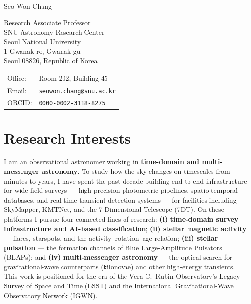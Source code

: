 \documentclass[letterpaper,11pt]{article}
\def\name{Seo-Won Chang}
\begin{document}
{\huge \name}

\vspace{0.2in}

\begin{minipage}{0.52\linewidth}
  Research Associate Professor \\
  SNU Astronomy Research Center \\
  Seoul National University \\
  1 Gwanak-ro, Gwanak-gu \\
  Seoul 08826, Republic of Korea
\end{minipage}
\begin{minipage}{0.46\linewidth}
  \begin{tabular}{ll}
    Office: & Room 202, Building 45 \\
    Email: & \href{mailto:seowon.chang@snu.ac.kr}{\tt seowon.chang@snu.ac.kr} \\
    ORCID: & \href{https://orcid.org/0000-0002-3118-8275}{\tt 0000-0002-3118-8275} \\
  \end{tabular}
\end{minipage}

\vspace{0.15in}

\section*{Research Interests}

I am an observational astronomer working in \textbf{time-domain and multi-messenger
astronomy}. To study how the sky changes on timescales from minutes to years, I have
spent the past decade building end-to-end infrastructure for wide-field surveys ---
high-precision photometric pipelines, spatio-temporal databases, and real-time
transient-detection systems --- for facilities including SkyMapper, KMTNet, and the
7-Dimensional Telescope (7DT). On these platforms I pursue four connected lines of
research: \textbf{(i) time-domain survey infrastructure and AI-based classification};
\textbf{(ii) stellar magnetic activity} --- flares, starspots, and the
activity--rotation--age relation; \textbf{(iii) stellar pulsation} --- the formation
channels of Blue Large-Amplitude Pulsators (BLAPs); and \textbf{(iv) multi-messenger
astronomy} --- the optical search for gravitational-wave counterparts (kilonovae) and
other high-energy transients. This work is positioned for the era of the Vera C.\ Rubin
Observatory's Legacy Survey of Space and Time (LSST) and the International
Gravitational-Wave Observatory Network (IGWN).
\end{document}

